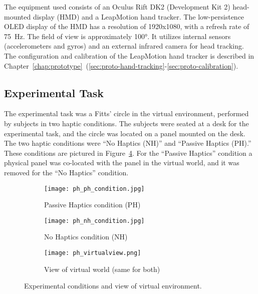The equipment used consists of an Oculus Rift DK2 (Development Kit 2) head-mounted display (HMD) and a LeapMotion hand tracker.
The low-persistence OLED display of the HMD has a resolution of 1920x1080, with a refresh rate of \SI{75}{\hertz}.
The field of view is approximately \ang{100}.
It utilizes internal sensors (accelerometers and gyros) and an external infrared camera for head tracking.
The configuration and calibration of the LeapMotion hand tracker is described in Chapter~\ref{chap:prototype}~(\ref{sec:proto-hand-tracking}-\ref{sec:proto-calibration}).

\subsection{Experimental Task}

The experimental task was a Fitts' circle in the virtual environment, performed by subjects in two haptic conditions.
The subjects were seated at a desk for the experimental task, and the circle was located on a panel mounted on the desk.
The two haptic conditions were ``No Haptics (NH)'' and ``Passive Haptics (PH).''
These conditions are pictured in Figure~\ref{fig:ph_conditions}.
For the ``Passive Haptics'' condition a physical panel was co-located with the panel in the virtual world, and it was removed for the ``No Haptics'' condition.

\mbox{}\hfill
\begin{figure}
    \centering
    \begin{subfigure}[t]{0.3\linewidth}
        \centering
        \texttt{[image: ph\_ph\_condition.jpg]}
        \caption{Passive Haptics condition (PH)}
        \label{fig:ph_conditions:ph_condition}
    \end{subfigure}\hfill
    \begin{subfigure}[t]{0.3\linewidth}
        \centering
        \texttt{[image: ph\_nh\_condition.jpg]}
        \caption{No Haptics condition (NH)}
        \label{fig:ph_conditions:nh_condition}
    \end{subfigure}\hfill
    \begin{subfigure}[t]{0.3\linewidth}
        \centering
        \texttt{[image: ph\_virtualview.png]}
        \caption{View of virtual world (same for both)}
        \label{fig:ph_conditions:virtual}
    \end{subfigure}
    \caption{Experimental conditions and view of virtual environment.}
    \label{fig:ph_conditions}
\end{figure}
\hfill\mbox{}

